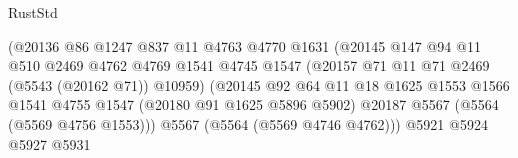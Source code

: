 \begin{lexlean}{RustStd}
\begin{coremodule}
                                            (@20136
                                              @86
                                              @1247
                                              @837
                                              @11
                                              @4763
                                              @4770
                                              @1631
                                              (@20145
                                                @147
                                                @94
                                                @11
                                                @510
                                                @2469
                                                @4762
                                                @4769
                                                @1541
                                                @4745
                                                @1547
                                                (@20157
                                                  @71
                                                  @11
                                                  @71
                                                  @2469
                                                  (@5543 (@20162 @71))
                                                  @10959)
                                                (@20145
                                                  @92
                                                  @64
                                                  @11
                                                  @18
                                                  @1625
                                                  @1553
                                                  @1566
                                                  @1541
                                                  @4755
                                                  @1547
                                                  (@20180 @91 @1625 @5896 @5902)
                                                  @20187
                                                  @5567
                                                  (@5564 (@5569 @4756 @1553)))
                                                @5567
                                                (@5564 (@5569 @4746 @4762)))
                                              @5921
                                              @5924
                                              @5927
                                              @5931

\end{coremodule}
\end{lexlean}
